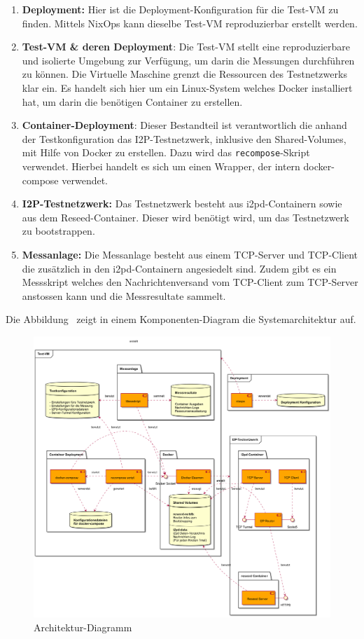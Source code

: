 \begin{enumerate}
    \item \textbf{Deployment:} Hier ist die Deployment-Konfiguration für die Test-VM zu finden. Mittels NixOps kann dieselbe Test-VM reproduzierbar erstellt werden.
    \item \textbf{Test-VM \& deren Deployment}: Die Test-VM stellt eine reproduzierbare und isolierte Umgebung zur Verfügung, um darin die Messungen durchführen zu können.
     Die Virtuelle Maschine grenzt die Ressourcen des Testnetzwerks klar ein.
     Es handelt sich hier um ein Linux-System welches Docker installiert hat,
	 um darin die benötigen Container zu erstellen.
    \item \textbf{Container-Deployment}: Dieser Bestandteil ist verantwortlich die anhand der Testkonfiguration das I2P-Testnetzwerk, inklusive den Shared-Volumes, mit Hilfe von Docker zu erstellen. Dazu wird das \lstinline|recompose|-Skript verwendet.
	 Hierbei handelt es sich um einen Wrapper, der intern docker-compose verwendet.
    \item \textbf{I2P-Testnetzwerk:} Das Testnetzwerk besteht aus i2pd-Containern sowie aus dem Reseed-Container. Dieser wird benötigt wird, um das Testnetzwerk zu bootstrappen.
    \item \textbf{Messanlage:} Die Messanlage besteht aus einem TCP-Server und TCP-Client die zusätzlich in den i2pd-Containern angesiedelt sind.
        Zudem gibt es ein Messskript welches den Nachrichtenversand vom TCP-Client zum TCP-Server anstossen kann und die Messresultate sammelt.
\end{enumerate}

Die Abbildung~ zeigt in einem Komponenten-Diagram die Systemarchitektur auf.

\begin{figure}[htp]
  \includegraphics[width=1.1\textwidth]{include/uml/componentDiagram.png}
  \caption{Architektur-Diagramm}\label{fig:architektur-diagramm}
\end{figure}


